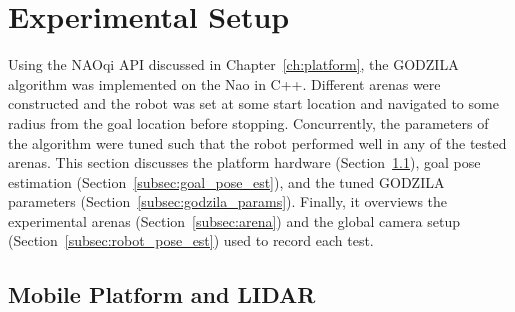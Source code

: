 \section{Experimental Setup} \label{sec:nav_exp_setup}
Using the NAOqi API discussed in Chapter~\ref{ch:platform}, the GODZILA algorithm was implemented 
on the Nao in C++. Different arenas were constructed and the robot was set at
some start location and navigated to some radius from the goal location before stopping.
Concurrently, the parameters of the algorithm were tuned such that the robot performed
well in any of the tested arenas. This section discusses the platform hardware
(Section~\ref{subsec:nao_and_lidar}), goal pose estimation (Section~\ref{subsec:goal_pose_est}),
and the tuned GODZILA parameters (Section~\ref{subsec:godzila_params}).
Finally, it overviews the experimental arenas (Section~\ref{subsec:arena}) and the
global camera setup (Section~\ref{subsec:robot_pose_est}) used to record each test.

\subsection{Mobile Platform and LIDAR} \label{subsec:nao_and_lidar}

